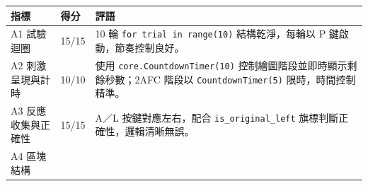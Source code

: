 \documentclass[14pt,]{extarticle}
\begin{document}
\begin{longtable}[]{@{}lll@{}}
\toprule
\begin{minipage}[b]{0.08\columnwidth}\raggedright
指標\strut
\end{minipage} & \begin{minipage}[b]{0.02\columnwidth}\raggedright
得分\strut
\end{minipage} & \begin{minipage}[b]{0.81\columnwidth}\raggedright
評語\strut
\end{minipage}\tabularnewline
\midrule
\endhead
\begin{minipage}[t]{0.08\columnwidth}\raggedright
A1 試驗迴圈\strut
\end{minipage} & \begin{minipage}[t]{0.02\columnwidth}\raggedright
15/15\strut
\end{minipage} & \begin{minipage}[t]{0.81\columnwidth}\raggedright
10 輪 \texttt{for\ trial\ in\ range(10)} 結構乾淨，每輪以 P
鍵啟動，節奏控制良好。\strut
\end{minipage}\tabularnewline
\begin{minipage}[t]{0.08\columnwidth}\raggedright
A2 刺激呈現與計時\strut
\end{minipage} & \begin{minipage}[t]{0.02\columnwidth}\raggedright
10/10\strut
\end{minipage} & \begin{minipage}[t]{0.81\columnwidth}\raggedright
使用 \texttt{core.CountdownTimer(10)}
控制繪圖階段並即時顯示剩餘秒數；2AFC 階段以 \texttt{CountdownTimer(5)}
限時，時間控制精準。\strut
\end{minipage}\tabularnewline
\begin{minipage}[t]{0.08\columnwidth}\raggedright
A3 反應收集與正確性\strut
\end{minipage} & \begin{minipage}[t]{0.02\columnwidth}\raggedright
15/15\strut
\end{minipage} & \begin{minipage}[t]{0.81\columnwidth}\raggedright
A／L 按鍵對應左右，配合 \texttt{is\_original\_left}
旗標判斷正確性，邏輯清晰無誤。\strut
\end{minipage}\tabularnewline
\begin{minipage}[t]{0.08\columnwidth}\raggedright
A4 區塊結構\strut
\end{minipage} & \begin{minipage}[t]{0.02\columnwidth}\raggedright

\end{minipage}
\end{longtable}
\end{document}
